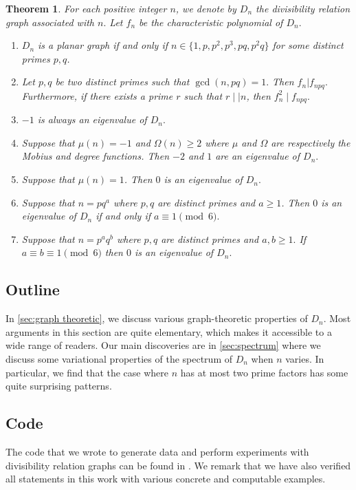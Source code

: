 \documentclass[11pt,a4paper]{amsart}
\newtheorem{thm}{Theorem}[section]
\theoremstyle{definition}
\numberwithin{equation}{section}
\begin{document}
\begin{thm}
For each positive integer $n$, we denote by $D_n$ the divisibility relation graph associated with $n.$ Let $f_n$ be the characteristic polynomial of $D_n.$ 

\begin{enumerate}
    \item $D_n$ is a planar graph if and only if $n \in \{1,p, p^2, p^3, pq, p^2 q\}$ for some distinct primes $p,q$. 
    \item Let $p,q$ be two distinct primes such that $\gcd(n,pq)=1.$ Then $f_{n}|f_{npq}.$ Furthermore, if there exists a prime $r$ such that $r \mid \mid n$, then $f_{n}^2 \mid f_{npq}.$
    \item $-1$ is always an eigenvalue of $D_n.$
    \item Suppose that $\mu(n)=-1$ and $\Omega(n) \geq 2$ where $\mu$ and $\Omega$ are respectively the Mobius and degree functions. Then $-2$ and $1$ are an eigenvalue of $D_n.$
    \item Suppose that $\mu(n)=1$. Then $0$ is an eigenvalue of $D_n.$
    \item Suppose that $n=pq^a$ where $p,q$ are distinct primes and $a \geq 1$. Then $0$ is an eigenvalue of $D_n$ if and only if $a \equiv 1 \pmod{6}.$
    \item Suppose that $n=p^a q^b$ where $p,q$ are distinct primes and $a,b \geq 1.$ If $a \equiv b \equiv 1 \pmod{6}$ then $0$ is an eigenvalue of $D_n.$
\end{enumerate}
\end{thm}



\subsection{Outline}
In \cref{sec:graph theoretic}, we discuss various graph-theoretic properties of $D_n$. Most arguments in this section are quite elementary, which makes it accessible to a wide range of readers. Our main discoveries are in \cref{sec:spectrum} where we discuss some variational properties of the spectrum of $D_n$ when $n$ varies. In particular, we find that the case where $n$ has at most two prime factors has some quite surprising patterns. 

\subsection{Code}
The code that we wrote to generate data and perform experiments with divisibility relation graphs can be found in \cite{nguyen_divisor_graph}.  We remark that we have also verified all statements in this work with various concrete and computable examples. 
\end{document}
